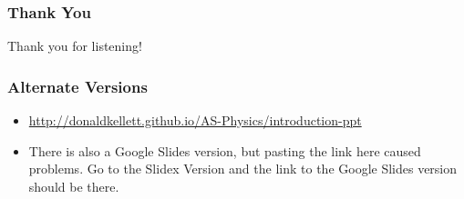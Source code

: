 \documentclass{beamer}
\begin{document}
\begin{frame}
\frametitle{Thank You}

Thank you for listening!

\end{frame}

\begin{frame}
\frametitle{Alternate Versions}
\begin{itemize}
\item \url{http://donaldkellett.github.io/AS-Physics/introduction-ppt}
\item There is also a Google Slides version, but pasting the link here caused problems.  Go to the Slidex Version and the link to the Google Slides version should be there.
\end{itemize}
\end{frame}
\end{document}
